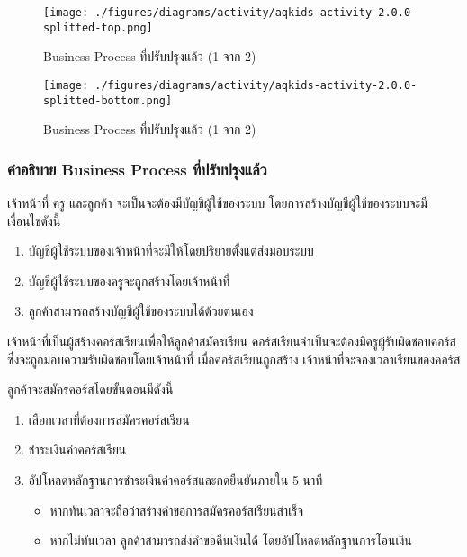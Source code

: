 \begin{figure}[H]
\texttt{[image: ./figures/diagrams/activity/aqkids-activity-2.0.0-splitted-top.png]}
\caption{Business Process ที่ปรับปรุงแล้ว (1 จาก 2)}
\label{fig:aqkids-activity-final-1}
\end{figure}

\begin{figure}[H]
\texttt{[image: ./figures/diagrams/activity/aqkids-activity-2.0.0-splitted-bottom.png]}
\caption{Business Process ที่ปรับปรุงแล้ว (1 จาก 2)}
\label{fig:aqkids-activity-final-2}
\end{figure}


\subsubsection{คำอธิบาย Business Process ที่ปรับปรุงแล้ว}
เจ้าหน้าที่ ครู และลูกค้า จะเป็นจะต้องมีบัญชีผู้ใช้ของระบบ โดยการสร้างบัญชีผู้ใช้ของระบบจะมีเงื่อนไขดังนี้

\begin{minipage}{\textwidth}
\begin{enumerate}
    \item บัญชีผู้ใช้ระบบของเจ้าหน้าที่จะมีให้โดยปริยายตั้งแต่ส่งมอบระบบ
    \item บัญชีผู้ใช้ระบบของครูจะถูกสร้างโดยเจ้าหน้าที่
    \item ลูกค้าสามารถสร้างบัญชีผู้ใช้ของระบบได้ด้วยตนเอง
\end{enumerate}
\end{minipage}

เจ้าหน้าที่เป็นผู้สร้างคอร์สเรียนเพื่อให้ลูกค้าสมัครเรียน คอร์สเรียนจำเป็นจะต้องมีครูผู้รับผิดชอบคอร์สซึ่งจะถูกมอบความรับผิดชอบโดยเจ้าหน้าที่ เมื่อคอร์สเรียนถูกสร้าง เจ้าหน้าที่จะจองเวลาเรียนของคอร์ส

\begin{minipage}{\textwidth}
ลูกค้าจะสมัครคอร์สโดยขั้นตอนมีดังนี้

\begin{enumerate}
    \item เลือกเวลาที่ต้องการสมัครคอร์สเรียน
    \item ชำระเงินค่าคอร์สเรียน
    \item อัปโหลดหลักฐานการชำระเงินค่าคอร์สและกดยืนยันภายใน 5 นาที
    \begin{itemize}
        \item หากทันเวลาจะถือว่าสร้างคำขอการสมัครคอร์สเรียนสำเร็จ
        \item หากไม่ทันเวลา ลูกค้าสามารถส่งคำขอคืนเงินได้ โดยอัปโหลดหลักฐานการโอนเงิน
    \end{itemize}
\end{enumerate}
\end{minipage}

